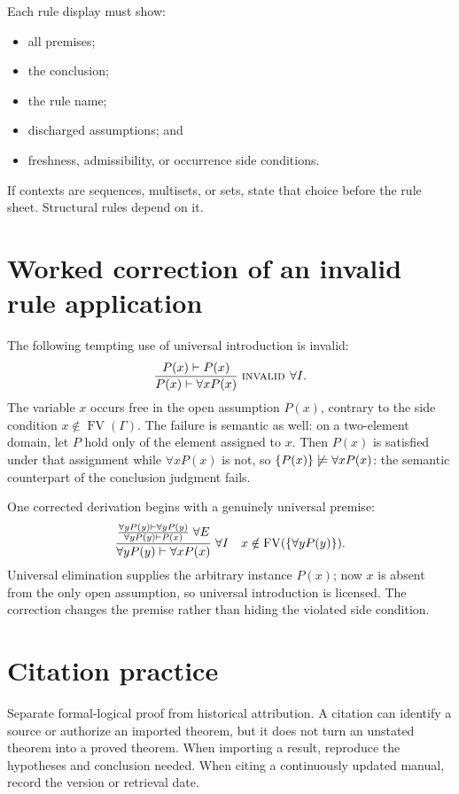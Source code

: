 \documentclass[11pt,oneside,openany]{book}
\theoremstyle{definition}
\theoremstyle{plain}
\theoremstyle{remark}
\DeclarePairedDelimiter{\set}{\lbrace}{\rbrace}
\newcommand{\FV}{\operatorname{FV}}
\newcommand{\derives}{\vdash}
\newcommand{\notentails}{\not\models}
\newcommand{\Rule}[3][]{\frac{#2}{#3}\;\textsc{#1}}
\newcommand{\side}[1]{\quad\text{#1}}
\begin{document}
Each rule display must show:
\begin{itemize}
  \item all premises;
  \item the conclusion;
  \item the rule name;
  \item discharged assumptions; and
  \item freshness, admissibility, or occurrence side conditions.
\end{itemize}
If contexts are sequences, multisets, or sets, state that choice before the
rule sheet.  Structural rules depend on it.

\section{Worked correction of an invalid rule application}
\label{sec:latex-style-rule-correction}

The following tempting use of universal introduction is invalid:
\[
  \Rule[invalid \(\forall I\)]
  {P(x)\derives P(x)}
  {P(x)\derives\forall xP(x)}.
\]
The variable \(x\) occurs free in the open assumption \(P(x)\), contrary to the
side condition \(x\notin\FV(\Gamma)\).  The failure is semantic as well: on a
two-element domain, let \(P\) hold only of the element assigned to \(x\).
Then \(P(x)\) is satisfied under that assignment while
\(\forall xP(x)\) is not, so \(\set{P(x)}\notentails\forall xP(x)\):
the semantic counterpart of the conclusion judgment fails.

One corrected derivation begins with a genuinely universal premise:
\[
  \Rule[\(\forall I\)]
  {\Rule[\(\forall E\)]
    {\forall yP(y)\derives\forall yP(y)}
    {\forall yP(y)\derives P(x)}}
  {\forall yP(y)\derives\forall xP(x)}
  \side{\(x\notin\FV(\set{\forall yP(y)})\)}.
\]
Universal elimination supplies the arbitrary instance \(P(x)\); now \(x\) is
absent from the only open assumption, so universal introduction is licensed.
The correction changes the premise rather than hiding the violated side
condition.

\section{Citation practice}
\label{sec:latex-style-05}

Separate formal-logical proof from historical attribution.  A citation can
identify a source or authorize an imported theorem, but it does not turn an
unstated theorem into a proved theorem.  When importing a result, reproduce the
hypotheses and conclusion needed.  When citing a continuously updated manual,
record the version or retrieval date.
\end{document}
